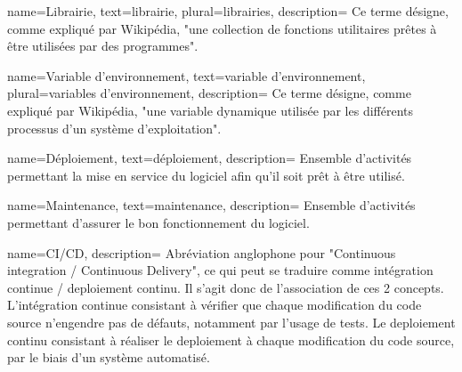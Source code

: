 {
    name={Librairie},
    text={librairie},
    plural={librairies},
    description={
        Ce terme désigne, comme expliqué par Wikipédia\cite{libraryDef}, "une collection de fonctions utilitaires prêtes à être utilisées par des programmes".
    }
}

{
    name={Variable d'environnement},
    text={variable d'environnement},
    plural={variables d'environnement},
    description={
        Ce terme désigne, comme expliqué par Wikipédia\cite{envvarDef}, "une variable dynamique utilisée par les différents processus d’un système d’exploitation".
    }
}

{
    name={Déploiement},
    text={déploiement},
    description={
        Ensemble d'activités permettant la mise en service du logiciel afin qu'il soit prêt à être utilisé.
    }
}

{
    name={Maintenance},
    text={maintenance},
    description={
        Ensemble d'activités permettant d'assurer le bon fonctionnement du logiciel.
    }
}

{
    name={CI/CD},
    description={
        Abréviation anglophone pour "Continuous integration / Continuous Delivery", ce qui peut se traduire comme intégration continue / \gls{deploiement} continu.
        Il s'agit donc de l'association de ces 2 concepts.
        L'intégration continue consistant à vérifier que chaque modification du code source n'engendre pas de défauts, notamment par l'usage de tests.
        Le \gls{deploiement} continu consistant à réaliser le \gls{deploiement} à chaque modification du code source, par le biais d'un système automatisé.
    }
}